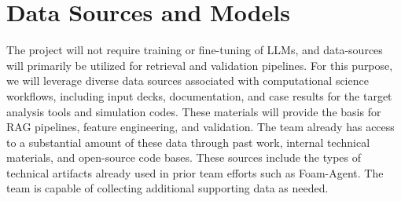 \documentclass[11pt]{article} \usepackage[margin=1in]{geometry}
\begin{document}

\section{Data Sources and Models}
The project will not require training or fine-tuning of LLMs, and data-sources will primarily be utilized for retrieval and validation pipelines. For this purpose, we will leverage diverse data sources associated with computational
science workflows, including input decks, documentation, and case
results for the target analysis tools and simulation codes. These materials
will provide the basis for RAG pipelines, feature engineering, and validation. The team already has access to a substantial amount of these data through past work, internal technical materials, and open-source code bases. These sources include the types of technical artifacts already used in prior team efforts such as Foam-Agent. The team is capable of collecting additional supporting data as needed. 
\end{document}
